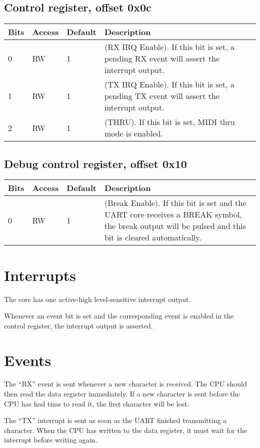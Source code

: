\documentclass[a4paper,11pt]{article}
\begin{document}
\subsection{Control register, offset 0x0c}
\begin{tabularx}{\textwidth}{|l|l|l|X|}
\hline
\bf Bits & \bf Access & \bf Default & \bf Description \\
\hline
0 & RW & 1 & (RX IRQ Enable). If this bit is set, a pending RX event will assert the interrupt output. \\
\hline
1 & RW & 1 & (TX IRQ Enable). If this bit is set, a pending TX event will assert the interrupt output. \\
\hline
2 & RW & 1 & (THRU). If this bit is set, MIDI thru mode is enabled. \\
\hline
\end{tabularx}

\subsection{Debug control register, offset 0x10}
\begin{tabularx}{\textwidth}{|l|l|l|X|}
\hline
\bf Bits & \bf Access & \bf Default & \bf Description \\
\hline
0 & RW & 1 & (Break Enable). If this bit is set and the UART core receives a BREAK symbol, the break output will be pulsed and this bit is cleared automatically. \\
\hline
\end{tabularx}

\section{Interrupts}
The core has one active-high level-sensitive interrupt output.

Whenever an event bit is set and the corresponding event is enabled in the control register, the interrupt output is asserted.

\section{Events}
The ``RX'' event is sent whenever a new character is received. The CPU should then read the data register immediately. If a new character is sent before the CPU has had time to read it, the first character will be lost.

The ``TX'' interrupt is sent as soon as the UART finished transmitting a character. When the CPU has written to the data register, it must wait for the interrupt before writing again.
\end{document}
